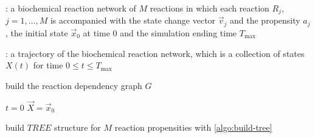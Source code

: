 \begin{algorithm}[H]
\DontPrintSemicolon
{}

\caption{\protect\TitleFunction{}}
\label{algo:dm-tree}

\Input: a biochemical reaction network of $M$ reactions in which each reaction $R_j$, $j=1, \dots, M$ is accompanied with the state change vector $\vec{v}_j$ and the propensity $a_j$, the initial state $\vec{x}_0$ at time $0$ and the simulation ending time $T_{\max}$\;

\Output: a trajectory of the biochemical reaction network, which is a collection of states $X(t)$ for time $0\le t\le T_{\max}$\;

build the reaction dependency graph $G$\;

$t = 0$\;
$\vec{X} = \vec{x}_0$\;


build $TREE$ structure for $M$ reaction propensities with \ref{algo:build-tree}\;


\end{algorithm}
